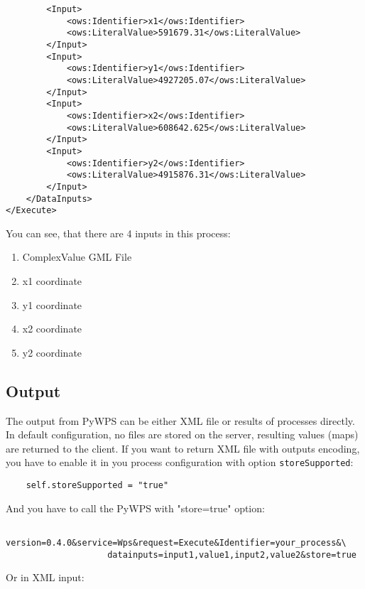 \documentclass[a4paper,11pt]{article}
\begin{document}
\begin{verbatim}
        <Input>
            <ows:Identifier>x1</ows:Identifier>
            <ows:LiteralValue>591679.31</ows:LiteralValue>
        </Input>
        <Input>
            <ows:Identifier>y1</ows:Identifier>
            <ows:LiteralValue>4927205.07</ows:LiteralValue>
        </Input>
        <Input>
            <ows:Identifier>x2</ows:Identifier>
            <ows:LiteralValue>608642.625</ows:LiteralValue>
        </Input>
        <Input>
            <ows:Identifier>y2</ows:Identifier>
            <ows:LiteralValue>4915876.31</ows:LiteralValue>
        </Input>
    </DataInputs>
</Execute>
    \end{verbatim}
     
    You can see, that there are 4 inputs in this process: 
     
    \begin{enumerate}
            \item ComplexValue GML File 
            \item x1 coordinate 
            \item y1 coordinate 
            \item x2 coordinate 
            \item y2 coordinate 
    \end{enumerate}
    \subsection{Output}
     
    The output from PyWPS can be either XML file or results of processes directly. In default configuration, no files are stored on the server, resulting values (maps) are 
    returned to the client. If you want to return XML file with outputs
    encoding, you have to enable it in you process configuration with
    option \texttt{storeSupported}:
     
    \begin{verbatim}
    self.storeSupported = "true"
    \end{verbatim}
     
    And you have to call the PyWPS with "store=true" option:
     
    \begin{verbatim}
    version=0.4.0&service=Wps&request=Execute&Identifier=your_process&\
                    datainputs=input1,value1,input2,value2&store=true
    \end{verbatim}
     
    Or in XML input:
     
\end{document}
